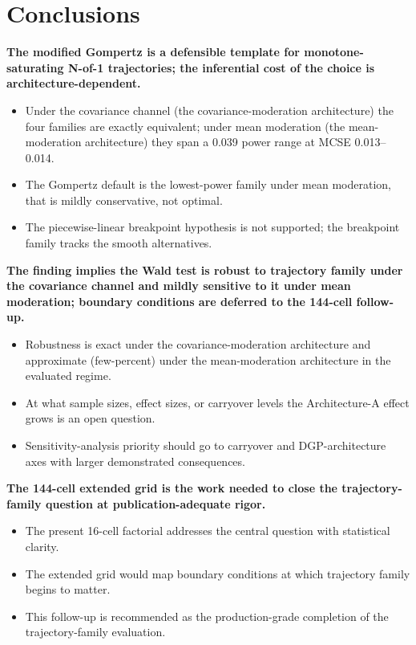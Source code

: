 \documentclass[
  11pt,
]{article}
\begin{document}
\section{Conclusions}\label{conclusions}

\textbf{The modified Gompertz is a defensible template for
monotone-saturating N-of-1 trajectories; the inferential cost of
the choice is architecture-dependent.}

\begin{itemize}\setlength{\itemsep}{2pt}\setlength{\parskip}{0pt}
\item Under the covariance channel (the covariance-moderation architecture) the four
  families are exactly equivalent; under mean moderation
  (the mean-moderation architecture) they span a 0.039 power range at MCSE
  0.013--0.014.
\item The Gompertz default is the lowest-power family under mean
  moderation, that is mildly conservative, not optimal.
\item The piecewise-linear breakpoint hypothesis is not
  supported; the breakpoint family tracks the smooth alternatives.
\end{itemize}

\textbf{The finding implies the Wald test is robust to
trajectory family under the covariance channel and mildly
sensitive to it under mean moderation; boundary conditions are
deferred to the 144-cell follow-up.}

\begin{itemize}\setlength{\itemsep}{2pt}\setlength{\parskip}{0pt}
\item Robustness is exact under the covariance-moderation architecture and approximate
  (few-percent) under the mean-moderation architecture in the evaluated regime.
\item At what sample sizes, effect sizes, or carryover levels
  the Architecture-A effect grows is an open question.
\item Sensitivity-analysis priority should go to carryover and
  DGP-architecture axes with larger demonstrated consequences.
\end{itemize}

\textbf{The 144-cell extended grid is the work needed to close
the trajectory-family question at publication-adequate rigor.}

\begin{itemize}\setlength{\itemsep}{2pt}\setlength{\parskip}{0pt}
\item The present 16-cell factorial addresses the central
  question with statistical clarity.
\item The extended grid would map boundary conditions at which
  trajectory family begins to matter.
\item This follow-up is recommended as the production-grade
  completion of the trajectory-family evaluation.
\end{itemize}
\end{document}
